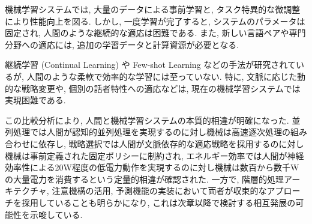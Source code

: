 機械学習システムでは, 大量のデータによる事前学習と, タスク特異的な微調整により性能向上を図る.
しかし, 一度学習が完了すると, システムのパラメータは固定され, 人間のような継続的な適応は困難である.
また, 新しい言語ペアや専門分野への適応には, 追加の学習データと計算資源が必要となる.

継続学習 (Continual Learning) や Few-shot Learning などの手法が研究されているが, 人間のような柔軟で効率的な学習には至っていない.
特に, 文脈に応じた動的な戦略変更や, 個別の話者特性への適応などは, 現在の機械学習システムでは実現困難である.

この比較分析により, 人間と機械学習システムの本質的相違が明確になった.
並列処理では人間が認知的並列処理を実現するのに対し機械は高速逐次処理の組み合わせに依存し, 戦略選択では人間が文脈依存的な適応戦略を採用するのに対し機械は事前定義された固定ポリシーに制約され, エネルギー効率では人間が神経効率性による20W程度の低電力動作を実現するのに対し機械は数百から数千Wの大量電力を消費するという定量的相違が確認された.
一方で, 階層的処理アーキテクチャ, 注意機構の活用, 予測機能の実装において両者が収束的なアプローチを採用していることも明らかになり, これは次章以降で検討する相互発展の可能性を示唆している.